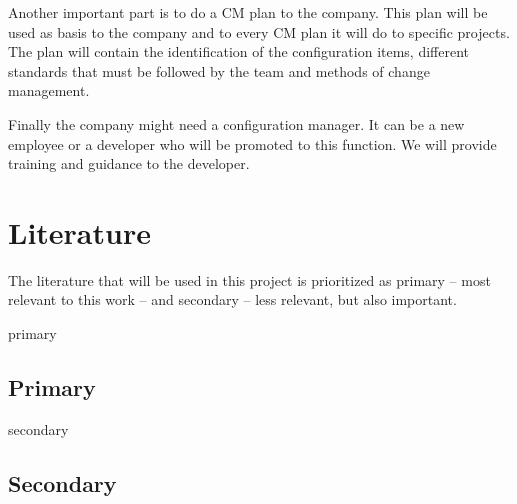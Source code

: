 \documentclass[a4paper]{article}
\begin{document}
Another important part is to do a CM plan to the company. This plan will be used as basis to the company and to every CM plan it will do to specific projects. The plan will contain the identification of the configuration items, different standards that must be followed by the team and methods of change management.

Finally the company might need a configuration manager. It can be a new employee or a developer who will be promoted to this function. We will provide training and guidance to the developer.

\newpage
\appendix
\section{Literature}

The literature that will be used in this project is prioritized as primary -- most relevant to this work -- and secondary -- less relevant, but also important. 
\begin{btSect}[alpha]{primary}
\subsection{Primary}
\btPrintAll
\end{btSect}

\begin{btSect}[alpha]{secondary}
\subsection{Secondary}
\btPrintAll
\end{btSect}
\end{document}
